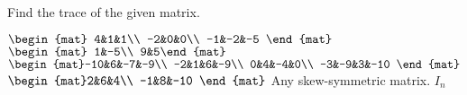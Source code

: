 
\begin{Exercise}[
name={},
title={}, 
difficulty=0,
origin={\cite{GH}}]
Find the trace of the given matrix.
\begin{multicols}{2}
\Question $\begin{mat} 4&1&1\\  -2&0&0\\  -1&-2&-5 \end{mat}$
\Question $\begin{mat} 1&-5\\  9&5\end{mat}$
\Question $\begin{mat}-10&6&-7&-9\\  -2&1&6&-9\\  0&4&-4&0\\  -3&-9&3&-10 \end{mat}$
\Question $\begin{mat}2&6&4\\  -1&8&-10 \end{mat}$
\Question Any skew-symmetric matrix.
\Question $I_n$
\EndCurrentQuestion
\end{multicols}


\end{Exercise}
